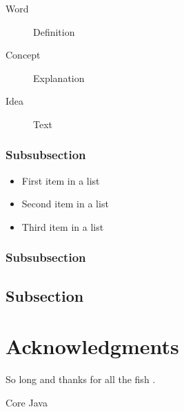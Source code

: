 \documentclass[fleqn,10pt]{SelfArx} %
\begin{document}
\lipsum[12] %

\begin{description}
\item[Word] Definition
\item[Concept] Explanation
\item[Idea] Text
\end{description}

\subsubsection{Subsubsection}

\lipsum[13] %

\begin{itemize}[noitemsep] %
\item First item in a list
\item Second item in a list
\item Third item in a list
\end{itemize}

\subsubsection{Subsubsection}

\lipsum[14] %

\subsection{Subsection}

\lipsum[15-23] %

\section*{Acknowledgments} %


So long and thanks for all the fish \cite{Figueredo:2009dg}.




Core Java
\end{document}
